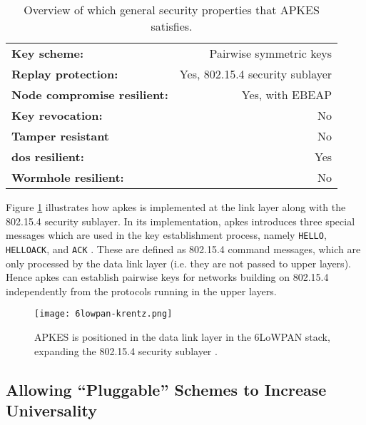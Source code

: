 \begin{table}[h]
\centering
\begin{tabular}{|l|r|}\hline
\textbf{Key scheme:} & Pairwise symmetric keys  \\
\textbf{Replay protection:}	 & Yes, 802.15.4 security sublayer \\
\textbf{Node compromise resilient:} & Yes, with EBEAP  \\
\textbf{Key revocation:} & No \\
\textbf{Tamper resistant} & No \\
\textbf{\gls{dos} resilient:} & Yes \\
\textbf{Wormhole resilient:} & No \\ \hline
\end{tabular}
\caption{Overview of which general security properties that APKES satisfies.}
\label{tab:apkes-props}
\end{table}

Figure \ref{fig:6lowpan-krentz} illustrates how \gls{apkes} is implemented at the link layer along with the 802.15.4 security sublayer. In its implementation, \gls{apkes} introduces three special messages which are used in the key establishment process, namely \texttt{HELLO}, \texttt{HELLOACK}, and \texttt{ACK} \cite{krentz20136lowpan}. These are defined as 802.15.4 command messages, which are only processed by the data link layer (i.e. they are not passed to upper layers). Hence \gls{apkes} can establish pairwise keys for networks building on 802.15.4 independently from the protocols running in the upper layers.

\begin{figure}
	\centering
	\texttt{[image: 6lowpan-krentz.png]}
	\caption[APKES is positioned in the data link layer in the 6LoWPAN stack, expanding the 802.15.4 security sublayer.]{APKES is positioned in the data link layer in the 6LoWPAN stack, expanding the 802.15.4 security sublayer \cite{krentz20136lowpan}.}
	\label{fig:6lowpan-krentz}
\end{figure}


\subsection{Allowing ``Pluggable'' Schemes to Increase Universality} 

